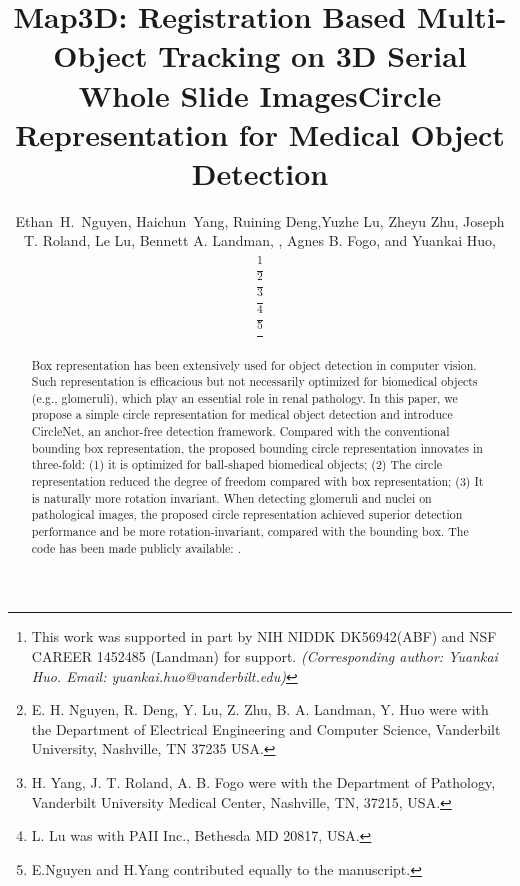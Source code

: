 \documentclass[journal]{IEEEtran}
\begin{document}
\title{Map3D: Registration Based Multi-Object Tracking on 3D Serial Whole Slide Images}


\title{Circle Representation for Medical Object Detection}
\author{Ethan~H.~Nguyen, Haichun~Yang, Ruining Deng,Yuzhe Lu, Zheyu Zhu, Joseph T. Roland, Le Lu, Bennett A. Landman, , Agnes B. Fogo, and Yuankai Huo, 

\thanks{This work was supported in part by NIH NIDDK DK56942(ABF) and NSF CAREER 1452485 (Landman) for support. \emph{(Corresponding author: Yuankai Huo. Email: yuankai.huo@vanderbilt.edu)}}

\thanks{E. H. Nguyen, R. Deng, Y. Lu, Z. Zhu, B. A. Landman, Y. Huo were with the Department of Electrical Engineering and Computer Science, Vanderbilt University, Nashville, TN 37235 USA.}

\thanks{H. Yang, J. T. Roland, A. B. Fogo were with the Department
of Pathology, Vanderbilt University Medical Center, Nashville,
TN, 37215, USA.}

\thanks{L. Lu was with PAII Inc., Bethesda MD 20817, USA.}

\thanks{\dag E.Nguyen and H.Yang contributed equally to the manuscript.}}

\maketitle




\maketitle

\begin{abstract}
Box representation has been extensively used for object detection in computer vision. Such representation is efficacious but not necessarily optimized for biomedical objects (e.g., glomeruli), which play an essential role in renal pathology. In this paper, we propose a simple circle representation for medical object detection and introduce CircleNet, an anchor-free detection framework. Compared with the conventional bounding box representation, the proposed bounding circle representation innovates in three-fold: (1) it is optimized for ball-shaped biomedical objects; (2) The circle representation reduced the degree of freedom compared with box representation; (3) It is naturally more rotation invariant. When detecting glomeruli and nuclei on pathological images, the proposed circle representation achieved superior detection performance and be more rotation-invariant, compared with the bounding box. The code has been made publicly available: \color{red}{https://github.com/hrlblab/CircleNet}. 
\end{abstract}
\end{document}
